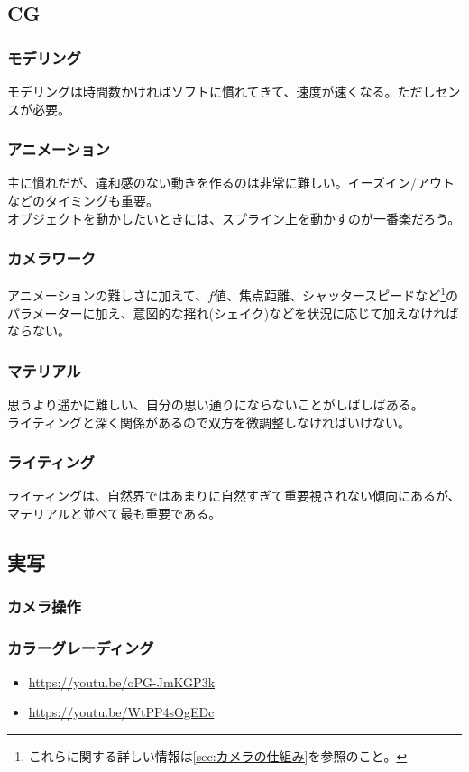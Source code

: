 \documentclass[a4paper]{ltjsreport}
\begin{document}
\subsection{CG}
\subsubsection{モデリング}
モデリングは時間数かければソフトに慣れてきて、速度が速くなる。ただしセンスが必要。
\subsubsection{アニメーション}
主に慣れだが、違和感のない動きを作るのは非常に難しい。イーズイン/アウトなどのタイミングも重要。\\
オブジェクトを動かしたいときには、スプライン上を動かすのが一番楽だろう。
\subsubsection{カメラワーク}
アニメーションの難しさに加えて、$f値$、焦点距離、シャッタースピードなど\footnote{これらに関する詳しい情報は\ref{sec:カメラの仕組み}を参照のこと。}のパラメーターに加え、意図的な揺れ(シェイク)などを状況に応じて加えなければならない。
\subsubsection{マテリアル}
思うより遥かに難しい、自分の思い通りにならないことがしばしばある。\\
ライティングと深く関係があるので双方を微調整しなければいけない。
\subsubsection{ライティング}
ライティングは、自然界ではあまりに自然すぎて重要視されない傾向にあるが、マテリアルと並べて最も重要である。
\subsection{実写}
\subsubsection{カメラ操作}
\subsubsection{カラーグレーディング}
\begin{itemize}
  \item \url{https://youtu.be/oPG-JmKGP3k}
  \item \url{https://youtu.be/WtPP4sOgEDc}
\end{itemize}
\end{document}
